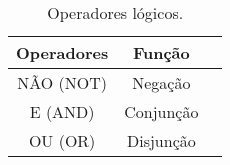 \begin{table}[h]
\caption{Operadores lógicos.}\label{tab:cap4-operadores-logicos}
\begin{center}
\begin{tabular}{|c|c|c|}
\hline
  \multicolumn{1}{|c|}{ \textbf{Operadores}}
&  \multicolumn{1}{|c|}{ \textbf{Função}} \\
\hline
\hline
NÃO (NOT)       & Negação \\ \hline
E (AND)         & Conjunção \\ \hline
OU (OR)         & Disjunção \\ \hline
\end{tabular}
\end{center}
\end{table}
